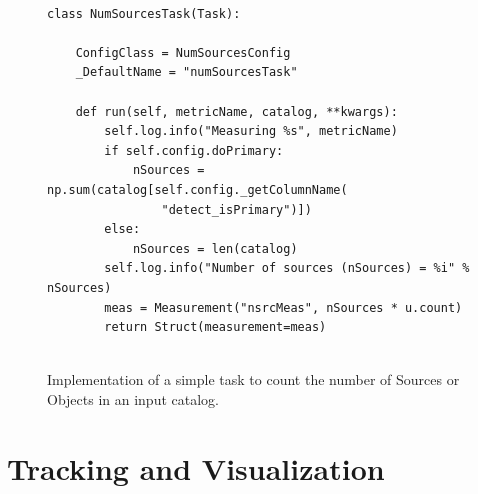 \begin{figure}[ht]
  \begin{center}
  \lstset{language=python}
  \begin{lstlisting}
  
class NumSourcesTask(Task):

    ConfigClass = NumSourcesConfig
    _DefaultName = "numSourcesTask"

    def run(self, metricName, catalog, **kwargs):
        self.log.info("Measuring %s", metricName)
        if self.config.doPrimary:
            nSources = np.sum(catalog[self.config._getColumnName(
                "detect_isPrimary")])
        else:
            nSources = len(catalog)
        self.log.info("Number of sources (nSources) = %i" % nSources)
        meas = Measurement("nsrcMeas", nSources * u.count)
        return Struct(measurement=meas)
  
    \end{lstlisting}
    \end{center}
  \caption{\label{fig:num_sources_task}
  Implementation of a simple task to count the number of Sources or Objects in an input catalog. }
  \par\medskip
\end{figure}

\section{Tracking and Visualization} \label{sec:tracking}

